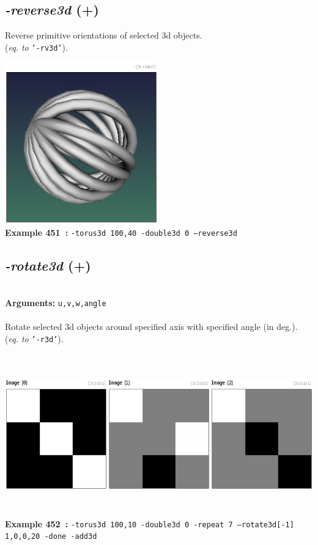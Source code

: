 \documentclass[a4paper,11pt,twoside]{book}
\begin{document}
\subsection{\emph{-reverse3d} (+)}\vspace*{-0.5em}
Reverse primitive orientations of selected 3d objects.
~\\(\emph{eq. to} {\small \texttt{'-rv3d'}}).
\begin{center}\includegraphics[keepaspectratio=true,height=7cm,width=\textwidth]{img/gmic_def451.jpg}\\
{\footnotesize \textbf{Example 451~:} \texttt{-torus3d 100,40 -double3d 0 --reverse3d}}
\end{center}

\subsection{\emph{-rotate3d} (+)}\vspace*{-0.5em}
~\\\textbf{Arguments: } 
{\small \texttt{u,v,w,angle}}\\~\\
Rotate selected 3d objects around specified axis with specified angle (in deg.).
~\\(\emph{eq. to} {\small \texttt{'-r3d'}}).
\begin{center}\includegraphics[keepaspectratio=true,height=7cm,width=\textwidth]{img/gmic_def452.jpg}\\
{\footnotesize \textbf{Example 452~:} \texttt{-torus3d 100,10 -double3d 0 -repeat 7 --rotate3d[-1] 1,0,0,20 -done -add3d}}
\end{center}
\end{document}
